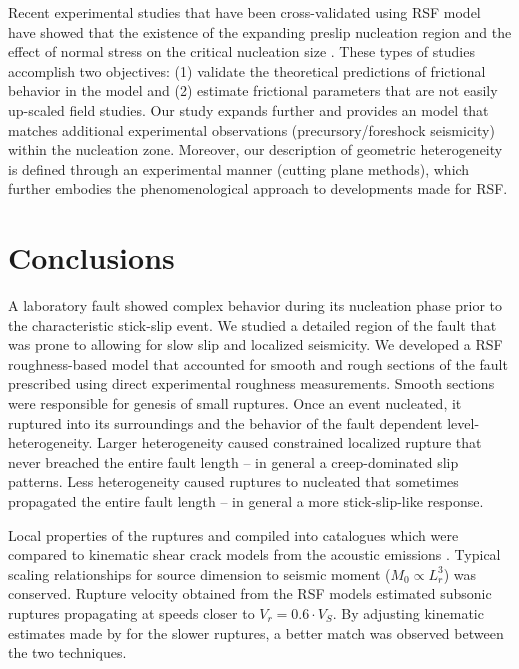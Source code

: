 \documentclass[preprint,1p, 10pt,authoryear]{elsarticle}
\begin{document}
Recent experimental studies that have been cross-validated using RSF model have showed that the existence of the expanding preslip nucleation region  \citep{Nielsen2010,Kaneko2011} and the effect of normal stress on the critical nucleation size \citep{Latour2013,Kaneko2016}. These types of studies accomplish two objectives: (1) validate the theoretical predictions of frictional behavior in the model \citep{Ruina1983,Rubin2005,Ampuero2008} and (2) estimate frictional parameters that are not easily up-scaled field studies. Our study expands further and provides an model that matches additional experimental observations (precursory/foreshock seismicity) within the nucleation zone. Moreover, our description of geometric heterogeneity is defined through an experimental manner (cutting plane methods), which further embodies the phenomenological approach to developments made for RSF.

\section{Conclusions}

A laboratory fault showed complex behavior during its nucleation phase prior to the characteristic stick-slip event.  We studied a detailed region of the fault that was prone to allowing for slow slip and localized seismicity.  We developed a RSF roughness-based model that accounted for smooth and rough sections of the fault prescribed using direct experimental roughness measurements. Smooth sections were responsible for genesis of small ruptures.  Once an event nucleated, it ruptured into its surroundings and the behavior of the fault dependent level-heterogeneity.  Larger heterogeneity caused constrained localized rupture that never breached the entire fault length -- in general a creep-dominated slip patterns. Less heterogeneity caused ruptures to nucleated that sometimes propagated the entire fault length -- in general a more stick-slip-like response.  

Local properties of the ruptures and compiled into catalogues which were compared to kinematic shear crack models from the acoustic emissions \citep{Selvadurai2019}.  Typical scaling relationships for source dimension to seismic moment ($M_{0} \propto L^{3}_{r}$) was conserved.  Rupture velocity obtained from the RSF models estimated subsonic ruptures propagating at speeds closer to $V_r = 0.6\cdot V_{S}$.  By adjusting kinematic estimates made by \citet{Selvadurai2019} for the slower ruptures, a better match was observed between the two techniques.
\end{document}
